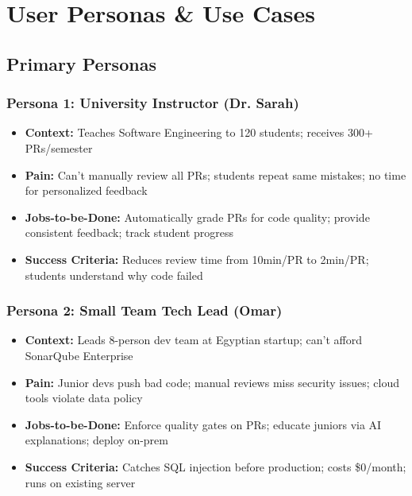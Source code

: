 \documentclass[11pt,a4paper]{article}
\begin{document}
\section{User Personas \& Use Cases}

\subsection{Primary Personas}

\subsubsection{Persona 1: University Instructor (Dr. Sarah)}
\begin{itemize}[leftmargin=*]
    \item \textbf{Context:} Teaches Software Engineering to 120 students; receives 300+ PRs/semester
    \item \textbf{Pain:} Can't manually review all PRs; students repeat same mistakes; no time for personalized feedback
    \item \textbf{Jobs-to-be-Done:} Automatically grade PRs for code quality; provide consistent feedback; track student progress
    \item \textbf{Success Criteria:} Reduces review time from 10min/PR to 2min/PR; students understand why code failed
\end{itemize}

\subsubsection{Persona 2: Small Team Tech Lead (Omar)}
\begin{itemize}[leftmargin=*]
    \item \textbf{Context:} Leads 8-person dev team at Egyptian startup; can't afford SonarQube Enterprise
    \item \textbf{Pain:} Junior devs push bad code; manual reviews miss security issues; cloud tools violate data policy
    \item \textbf{Jobs-to-be-Done:} Enforce quality gates on PRs; educate juniors via AI explanations; deploy on-prem
    \item \textbf{Success Criteria:} Catches SQL injection before production; costs \$0/month; runs on existing server
\end{itemize}
\end{document}
